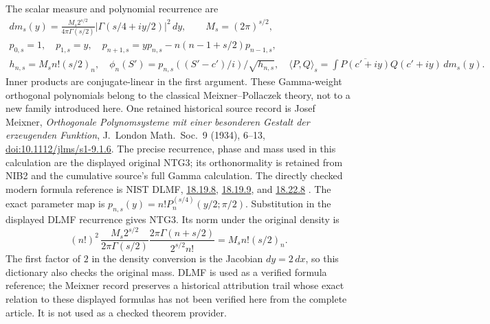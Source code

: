 The scalar measure and polynomial recurrence are
\[
\begin{gathered}
 dm_s(y)=\frac{M_s2^{s/2}}{4\pi\Gamma(s/2)}
              |\Gamma(s/4+iy/2)|^2\,dy,\qquad M_s=(2\pi)^{s/2},\\
 p_{0,s}=1,\quad p_{1,s}=y,\quad
 p_{n+1,s}=yp_{n,s}-n(n-1+s/2)p_{n-1,s},\\
 h_{n,s}=M_s n!(s/2)_n,\quad
 \phi_n(S')=p_{n,s}((S'-c')/i)/\sqrt{h_{n,s}},\quad
 \langle P,Q\rangle_s=\int\overline{P(c'+iy)}Q(c'+iy)\,dm_s(y).
\end{gathered}                                                    \tag{NTG3}
\]
Inner products are conjugate-linear in the first argument.
These Gamma-weight orthogonal polynomials belong to the classical
Meixner--Pollaczek theory, not to a new family introduced here.
One retained historical source record is Josef Meixner,
\emph{Orthogonale Polynomsysteme mit einer besonderen Gestalt der
erzeugenden Funktion}, J.\ London Math.\ Soc.\ 9 (1934), 6--13,
\href{https://doi.org/10.1112/jlms/s1-9.1.6}{doi:10.1112/jlms/s1-9.1.6}.
The precise recurrence, phase and mass used in this calculation
are the displayed original NTG3; its orthonormality is retained
from NIB2 and the cumulative source's full Gamma calculation.
The directly checked modern formula reference is NIST DLMF,
\href{https://dlmf.nist.gov/18.19.E8}{18.19.8},
\href{https://dlmf.nist.gov/18.19.E9}{18.19.9}, and
\href{https://dlmf.nist.gov/18.22.E8}{18.22.8}
\cite[eqs.~(18.19.8)--(18.19.9), (18.22.8)]{human:dlmf18}.
The exact parameter map is
$p_{n,s}(y)=n!P_n^{(s/4)}(y/2;\pi/2)$.
Substitution in the displayed DLMF recurrence gives NTG3.
Its norm under the original density is
\[
 (n!)^2\,\frac{M_s2^{s/2}}{2\pi\Gamma(s/2)}
       \frac{2\pi\Gamma(n+s/2)}{2^{s/2}n!}
       =M_sn!(s/2)_n .
\]
The first factor of $2$ in the density conversion is the
Jacobian $dy=2\,dx$, so this dictionary also checks the
original mass. DLMF is used as a verified formula reference;
the Meixner record preserves a historical attribution trail whose
exact relation to these displayed formulas has not been verified here
from the complete article. It is not used as a checked theorem provider.

